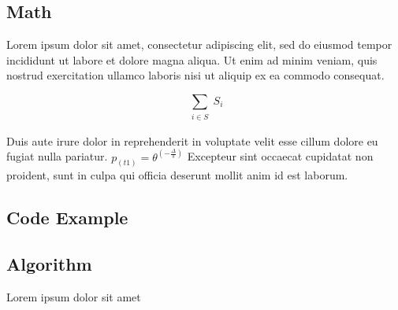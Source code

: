 \documentclass[12pt, a4paper]{article} %
\begin{document}

\subsection{Math}


Lorem ipsum dolor sit amet, consectetur adipiscing elit, sed do eiusmod tempor incididunt ut labore et dolore magna aliqua. Ut enim ad minim veniam, quis nostrud exercitation ullamco laboris nisi ut aliquip ex ea commodo consequat. 

\begin{equation} %
 \sum_{\substack{ %
		 i \in S}}
	S_i
\end{equation} %

Duis aute irure dolor in reprehenderit in voluptate velit esse cillum dolore eu fugiat nulla pariatur. \(p_(t1)=\theta^(-\frac{\Delta}{s})\) %
Excepteur sint occaecat cupidatat non proident, sunt in culpa qui officia deserunt mollit anim id est laborum.

\newpage
\subsection{Code Example}


 

\newpage
\subsection{Algorithm}



\begin{algorithm}
\caption{Lorem ipsum dolor sit amet}
\begin{algorithmic}



\end{algorithmic}
\end{algorithm}
\end{document}
